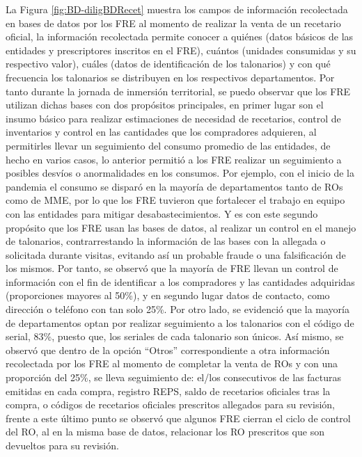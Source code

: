 \documentclass[
]{book}
\begin{document}
La Figura \ref{fig:BD-diligBDRecet} muestra los campos de información recolectada en bases de datos por los FRE al momento de realizar la venta de un recetario oficial, la información recolectada permite conocer a quiénes (datos básicos de las entidades y prescriptores inscritos en el FRE), cuántos (unidades consumidas y su respectivo valor), cuáles (datos de identificación de los talonarios) y con qué frecuencia los talonarios se distribuyen en los respectivos departamentos. Por tanto durante la jornada de inmersión territorial, se puedo observar que los FRE utilizan dichas bases con dos propósitos principales, en primer lugar son el insumo básico para realizar estimaciones de necesidad de recetarios, control de inventarios y control en las cantidades que los compradores adquieren, al permitirles llevar un seguimiento del consumo promedio de las entidades, de hecho en varios casos, lo anterior permitió a los FRE realizar un seguimiento a posibles desvíos o anormalidades en los consumos. Por ejemplo, con el inicio de la pandemia el consumo se disparó en la mayoría de departamentos tanto de ROs como de MME, por lo que los FRE tuvieron que fortalecer el trabajo en equipo con las entidades para mitigar desabastecimientos. Y es con este segundo propósito que los FRE usan las bases de datos, al realizar un control en el manejo de talonarios, contrarrestando la información de las bases con la allegada o solicitada durante visitas, evitando así un probable fraude o una falsificación de los mismos. Por tanto, se observó que la mayoría de FRE llevan un control de información con el fin de identificar a los compradores y las cantidades adquiridas (proporciones mayores al 50\%), y en segundo lugar datos de contacto, como dirección o teléfono con tan solo 25\%. Por otro lado, se evidenció que la mayoría de departamentos optan por realizar seguimiento a los talonarios con el código de serial, 83\%, puesto que, los seriales de cada talonario son únicos. Así mismo, se observó que dentro de la opción ``Otros'' correspondiente a otra información recolectada por los FRE al momento de completar la venta de ROs y con una proporción del 25\%, se lleva seguimiento de: el/los consecutivos de las facturas emitidas en cada compra, registro REPS, saldo de recetarios oficiales tras la compra, o códigos de recetarios oficiales prescritos allegados para su revisión, frente a este último punto se observó que algunos FRE cierran el ciclo de control del RO, al en la misma base de datos, relacionar los RO prescritos que son devueltos para su revisión.
\end{document}
